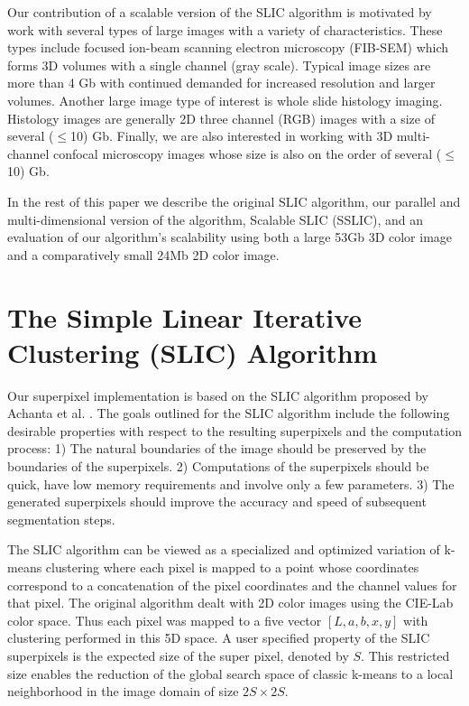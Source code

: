 \documentclass{InsightArticle}
\begin{document}
Our contribution of a scalable version of the SLIC algorithm is motivated by
work with several types of large images with a variety of characteristics.
These types include focused ion-beam scanning electron microscopy (FIB-SEM)
which forms 3D volumes with a single channel (gray scale). Typical image sizes are
more than 4 Gb with continued demanded for increased resolution and larger
volumes. Another large image type of interest is whole slide histology
imaging. Histology images are generally 2D three channel (RGB) images with a size of
several ($\leq$10) Gb. Finally, we are also interested in working with 3D
multi-channel confocal microscopy images whose size is also on the order of several
($\leq$10) Gb.

In the rest of this paper we describe the original SLIC algorithm, our parallel
and multi-dimensional version of the algorithm, Scalable SLIC (SSLIC), and an
evaluation of our algorithm's scalability using both a large 53Gb 3D color image
and a comparatively small 24Mb 2D color image.

\section{The Simple Linear Iterative Clustering (SLIC) Algorithm}

Our superpixel implementation is based on the SLIC algorithm proposed by Achanta
et al. \cite{DBLP:journals/pami/AchantaSSLFS12}. The goals outlined for the SLIC
algorithm include the following desirable properties with respect to the
resulting superpixels and the computation process: 1) The natural boundaries of
the image should be preserved by the boundaries of the superpixels. 2)
Computations of the superpixels should be quick, have low memory requirements
and involve only a few parameters. 3) The generated superpixels should improve
the accuracy and speed of subsequent segmentation steps.

The SLIC algorithm can be viewed as a specialized and optimized variation of
k-means clustering where each pixel is mapped to a point whose
coordinates correspond to a concatenation of the pixel coordinates and the
channel values for that pixel. The original algorithm dealt with 2D color images
using the CIE-Lab color space. Thus each pixel was mapped to a five vector $[L, a, b, x,
y]$ with clustering performed in this 5D space. A user
specified property of the SLIC superpixels is the expected size of the super
pixel, denoted by $S$. This restricted size enables the reduction of the global search space of
classic k-means to a local neighborhood in the image domain of size $2S \times 2S$.
\end{document}

